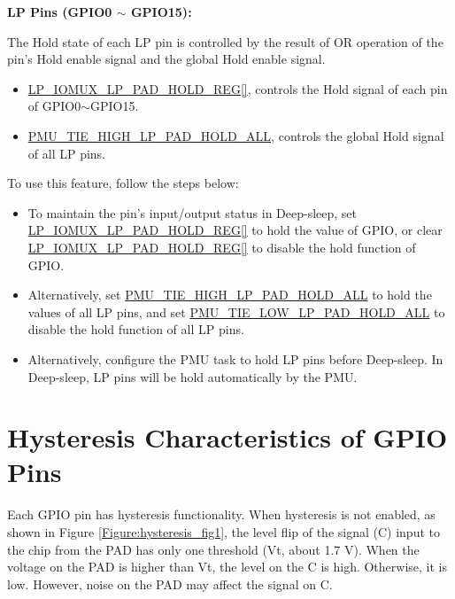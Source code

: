 \documentclass[main\_\_EN.tex]{subfiles}
\begin{document}
{\textbf{LP Pins (GPIO0 $\sim$ GPIO15):}

The Hold state of each LP pin is controlled by the result of OR operation of the pin's Hold enable signal and the global Hold enable signal.

\begin{itemize}
    \item \hyperref[regdesc:LPIOMUXLPPADHOLDREG]{LP\_IOMUX\_LP\_PAD\_HOLD\_REG[]}, controls the Hold signal of each pin of GPIO0$\sim$GPIO15.
    \item \hyperref[fielddesc:PMUTIEHIGHLPPADHOLDALL]{PMU\_TIE\_HIGH\_LP\_PAD\_HOLD\_ALL}, controls the global Hold signal of all LP pins.
\end{itemize}

To use this feature, follow the steps below:

    \begin{itemize}
        \item To maintain the pin's input/output status in Deep-sleep, set \hyperref[regdesc:LPIOMUXLPPADHOLDREG]{LP\_IOMUX\_LP\_PAD\_HOLD\_REG[]} to hold the value of GPIO, or clear \hyperref[regdesc:LPIOMUXLPPADHOLDREG]{LP\_IOMUX\_LP\_PAD\_HOLD\_REG[]} to disable the hold function of GPIO.
        \item Alternatively, set \hyperref[fielddesc:PMUTIEHIGHLPPADHOLDALL]{PMU\_TIE\_HIGH\_LP\_PAD\_HOLD\_ALL} to hold the values of all LP pins, and set \hyperref[fielddesc:PMUTIELOWLPPADHOLDALL]{PMU\_TIE\_LOW\_LP\_PAD\_HOLD\_ALL} to disable the hold function of all LP pins.
        \item Alternatively, configure the PMU task to hold LP pins before Deep-sleep. In Deep-sleep, LP pins will be hold automatically by the PMU.
    \end{itemize}
}

\section{Hysteresis Characteristics of GPIO Pins}\label{PadHysEn}

Each GPIO pin has hysteresis functionality. When hysteresis is not enabled, as shown in Figure \ref{Figure:hysteresis_fig1}, the level flip of the signal (C) input to the chip from the PAD has only one threshold (Vt, about 1.7 V). When the voltage on the PAD is higher than Vt, the level on the C is high. Otherwise, it is low. However, noise on the PAD may affect the signal on C.
\end{document}
